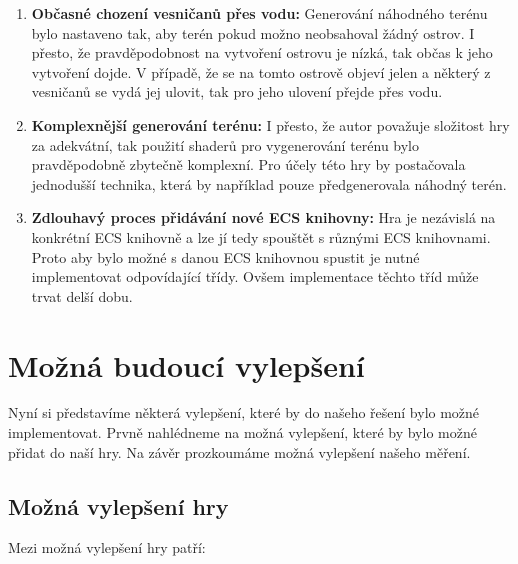 \begin{enumerate}
    \item \textbf{Občasné chození vesničanů přes vodu:} Generování náhodného terénu bylo nastaveno tak, aby terén pokud možno neobsahoval žádný ostrov. I přesto, že pravděpodobnost na vytvoření ostrovu je nízká, tak občas k jeho vytvoření dojde. V případě, že se na tomto ostrově objeví jelen a některý z vesničanů se vydá jej ulovit, tak pro jeho ulovení přejde přes vodu.


    \item \textbf{Komplexnější generování terénu:} I přesto, že autor považuje složitost hry za adekvátní, tak použití shaderů pro vygenerování terénu bylo pravděpodobně zbytečně komplexní. Pro účely této hry by postačovala jednodušší technika, která by například pouze předgenerovala náhodný terén.

    \item \textbf{Zdlouhavý proces přidávání nové ECS knihovny:} Hra je nezávislá na konkrétní ECS knihovně a lze jí tedy spouštět s různými ECS knihovnami. Proto aby bylo možné s danou ECS knihovnou spustit je nutné implementovat odpovídající třídy. Ovšem implementace těchto tříd může trvat delší dobu.

\end{enumerate}

\section{Možná budoucí vylepšení}
Nyní si představíme některá vylepšení, které by do našeho řešení bylo možné implementovat. Prvně nahlédneme na možná vylepšení, které by bylo možné přidat do naší hry. Na závěr prozkoumáme možná vylepšení našeho měření.

\subsection{Možná vylepšení hry}
Mezi možná vylepšení hry patří:


